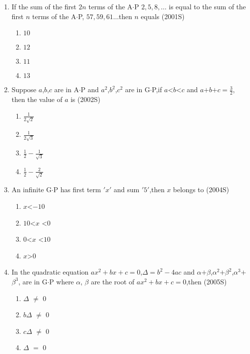 \documentclass[journal,12pt,twocolumn]{IEEEtran}
\theoremstyle{remark}
\begin{document}
\begin{enumerate} [start=5]
\begin{enumerate}
    \end{enumerate}
    \item If the sum  of the first $2n$ terms of the A$\cdot$P $2,5,8,\dots$ is equal to the sum of the first $n$ terms of the A$\cdot$P, $57,59,61\dots$then $n$ equals
    \hfill(2001S)
    \begin{enumerate}
        \item $10$
        \item $12$
        \item $11$
        \item $13$
    \end{enumerate}
    \item  Suppose $a$,$b$,$c$ are in A$\cdot$P and $a^2$,$b^2$,$c^2$ are in G$\cdot$P,if $a$\textless$b$\textless$c$ and $a$$+$$b$$+$$c$$=$$\frac{3}{2}$, then the value of $a$ is 
    \hfill(2002S)
    \begin{enumerate}
        \item $\frac{1}{2\sqrt{2}}$
        \item $\frac{1}{2\sqrt{3}}$
        \item $\frac{1}{2}-\frac{1}{\sqrt{3}}$
        \item $\frac{1}{2}-\frac{2}{\sqrt{2}}$
    \end{enumerate}
    \item An infinite G$\cdot$P has first term $'x'$ and sum $'5'$,then $x$ belongs to 
    \hfill(2004S)
    \begin{enumerate}
        \item $x$\textless$-10$
        \item $10$\textless $x$ \textless$0$
        \item $0$\textless $x$ \textless$10$
        \item $x$\textgreater$0$
    \end{enumerate}
    \item In the quadratic equation $ax^2+bx+c$$=$$0$,$\Delta$$=$$b^2-4ac$ and $\alpha$$+$$\beta$,$\alpha^2$$+$$\beta^2$,$\alpha^3$$+$$\beta^3$, are in G$\cdot$P where $\alpha$, $\beta$ are the root of $ax^2+bx+c$$=$$0$,then
    \hfill(2005S)
    \begin{enumerate}
        \item $\Delta$ $\neq$ $0$
        \item $b\Delta$ $\neq$ $0$
        \item $c\Delta$ $\neq$ $0$
        \item $\Delta$ $=$ $0$
    \end{enumerate}

\end{enumerate}
\end{document}

